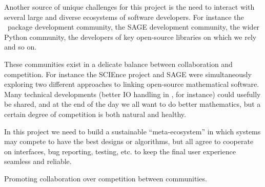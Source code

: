 Another source of unique challenges for this project is the need to
interact with several large and diverse ecosystems of software
developers. For instance the \GAP\ package development community, the
SAGE development community, the wider Python community, the developers
of key open-source libraries on which we rely and so on.

These communities exist in a delicate balance between collaboration
and competition. For instance the SCIEnce project and SAGE were
simultaneously exploring two different approaches to linking
open-source mathematical software. Many technical developments (better
IO handling in \GAP, for instance) could usefully be shared, and at
the end of the day we all want to do better mathematics, but a certain
degree of competition is both natural and healthy.

In this project we need to build a sustainable ``meta-ecosystem'' in
which systems may compete to have the best designs or algorithms, but
all agree to cooperate on interfaces, bug reporting, testing, etc. to
keep the final user experience seamless and reliable.


Promoting collaboration over competition between communities.
